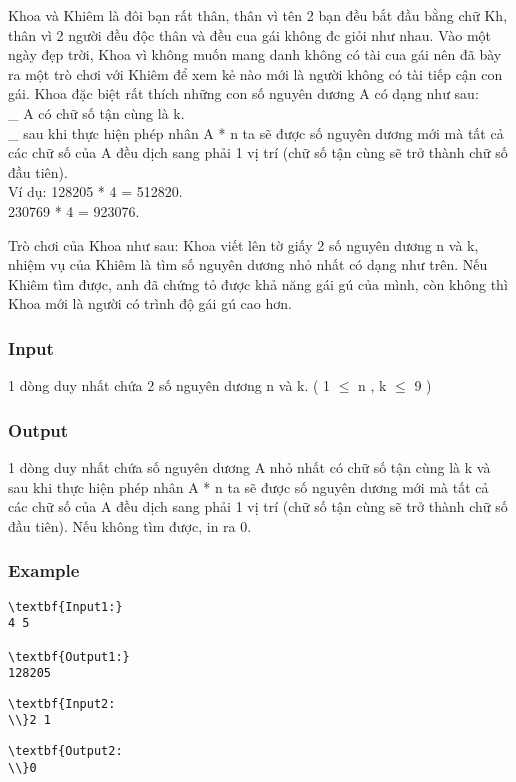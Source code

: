 



   Khoa và Khiêm là đôi bạn rất thân, thân vì tên 2 bạn đều bắt đầu bằng chữ Kh, thân vì 2 người đều độc thân và đều cua gái không đc giỏi như nhau. Vào một ngày đẹp trời, Khoa vì không muốn mang danh không có tài cua gái nên đã bày ra một trò chơi với Khiêm để xem kẻ nào mới là người không có tài tiếp cận con gái. Khoa đặc biệt rất thích những con số nguyên dương A có dạng như sau:   
\\   \_ A có chữ số tận cùng là k.   
\\   \_ sau khi thực hiện phép nhân A * n ta sẽ được số nguyên dương mới mà tất cả các chữ số của A đều dịch sang phải 1 vị trí (chữ số tận cùng sẽ trở thành chữ số đầu tiên).   
\\   Ví dụ:      128205 * 4 = 512820.   
\\   230769 * 4 = 923076.  

   Trò chơi của Khoa như sau: Khoa viết lên tờ giấy 2 số nguyên dương n và k, nhiệm vụ của Khiêm là tìm số nguyên dương nhỏ nhất có dạng như trên. Nếu Khiêm tìm được, anh đã chứng tỏ được khả năng gái gú của mình, còn không thì Khoa mới là người có trình độ gái gú cao hơn.  

\subsubsection{   Input  }

   1 dòng duy nhất chứa 2 số nguyên dương n và k. ( 1  $\le$  n , k  $\le$  9 )  

\subsubsection{   Output  }

   1 dòng duy nhất chứa số nguyên dương A nhỏ nhất có chữ số tận cùng là k và sau khi thực hiện phép nhân A * n ta sẽ được số nguyên dương mới mà tất cả các chữ số của A đều dịch sang phải 1 vị trí (chữ số tận cùng sẽ trở thành chữ số đầu tiên). Nếu không tìm được, in ra 0.  

\subsubsection{   Example  }
\begin{verbatim}
\textbf{Input1:}
4 5

\textbf{Output1:}
128205\end{verbatim}
\begin{verbatim}
\textbf{Input2:
\\}2 1\end{verbatim}
\begin{verbatim}
\textbf{Output2:
\\}0\end{verbatim}
